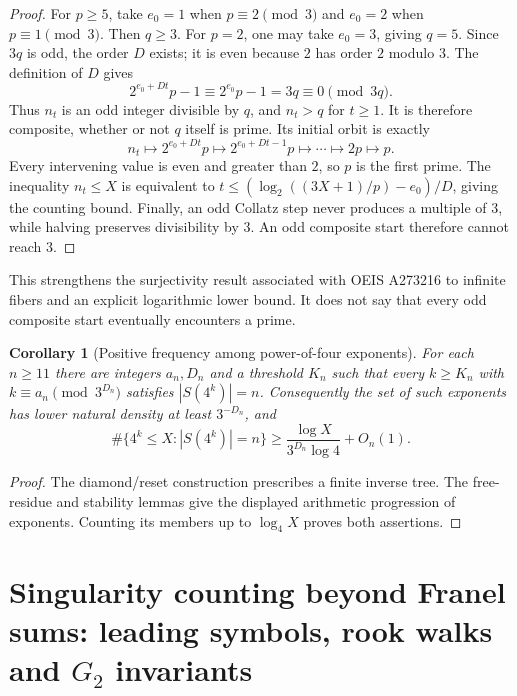 \documentclass[11pt,a4paper]{article}
\newtheorem{corollary}[theorem]{Corollary}
\theoremstyle{definition}
\theoremstyle{remark}
\numberwithin{equation}{section}
\DeclareMathOperator{\CT}{CT}
\begin{document}
\begin{proof}
For $p\ge5$, take $e_0=1$ when $p\equiv2\pmod3$ and $e_0=2$ when
$p\equiv1\pmod3$. Then $q\ge3$. For $p=2$, one may take $e_0=3$,
giving $q=5$. Since $3q$ is odd, the order $D$ exists; it is even because
$2$ has order $2$ modulo $3$. The definition of $D$ gives
\[
 2^{e_0+Dt}p-1\equiv2^{e_0}p-1=3q\equiv0\pmod{3q}.
\]
Thus $n_t$ is an odd integer divisible by $q$, and $n_t>q$ for $t\ge1$.
It is therefore composite, whether or not $q$ itself is prime. Its initial
orbit is exactly
\[
 n_t\longmapsto2^{e_0+Dt}p\longmapsto
 2^{e_0+Dt-1}p\longmapsto\cdots\longmapsto2p\longmapsto p.
\]
Every intervening value is even and greater than $2$, so $p$ is the first
prime. The inequality $n_t\le X$ is equivalent to
$t\le(\log_2((3X+1)/p)-e_0)/D$, giving the counting bound.
Finally, an odd Collatz step never produces a multiple of $3$, while
halving preserves divisibility by $3$. An odd composite start therefore
cannot reach $3$.
\end{proof}

This strengthens the surjectivity result associated with OEIS A273216 to
infinite fibers and an explicit logarithmic lower bound. It does not say
that every odd composite start eventually encounters a prime.

\begin{corollary}[Positive frequency among power-of-four exponents]
For each $n\ge11$ there are integers $a_n,D_n$ and a threshold $K_n$ such
that every $k\ge K_n$ with $k\equiv a_n\pmod{3^{D_n}}$ satisfies
$|S(4^k)|=n$. Consequently the set of such exponents has lower natural
density at least $3^{-D_n}$, and
\[
 \#\{4^k\le X:|S(4^k)|=n\}
 \ge\frac{\log X}{3^{D_n}\log4}+O_n(1).
\]
\end{corollary}
\begin{proof}
The diamond/reset construction prescribes a finite inverse tree. The
free-residue and stability lemmas give the displayed arithmetic progression
of exponents. Counting its members up to $\log_4X$ proves both assertions.
\end{proof}

\section{Singularity counting beyond Franel sums: leading symbols, rook walks and \texorpdfstring{$G_2$}{G2} invariants}\label{B:F:sec}

\providecommand{\CT}{\operatorname{CT}}
\providecommand{\Fwidth}{\operatorname{w}}
\end{document}
